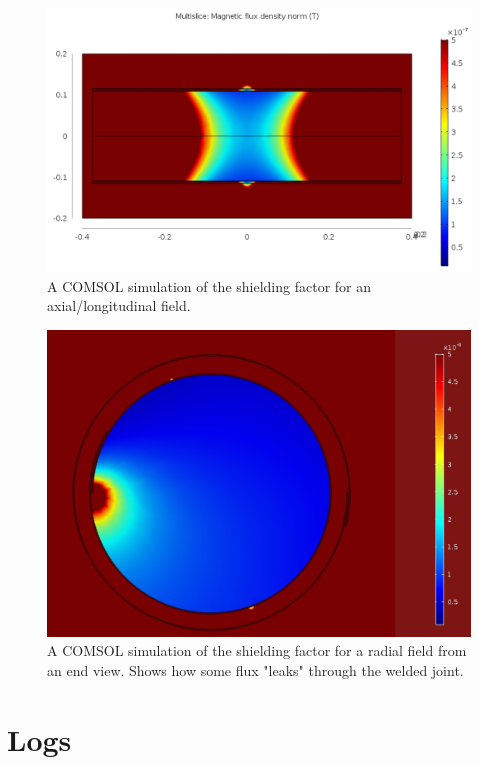 \documentclass{TheMartianReport}
\begin{document}
\begin{figure}[h]
	\centering
	\includegraphics[scale=0.5]{axial_sim}
	\caption{A COMSOL simulation of the shielding factor for an axial/longitudinal field.}
	\label{fig:AxialSim}
\end{figure}

\begin{figure}[h]
	\centering
	\includegraphics[scale=0.35]{end_sim}
	\caption{A COMSOL simulation of the shielding factor for a radial field from an end view. Shows how some flux "leaks" through the welded joint.}
	\label{fig:EndSim}
\end{figure}

\pagebreak[18]

\section{Logs}
\end{document}

